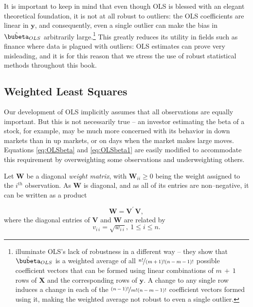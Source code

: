 \documentclass[graybox,envcountchap,sectrefs]{svmono}\usepackage[]{graphicx}\usepackage[]{xcolor}
\begin{document}
\begin{appendices}
It is important to keep in mind that even though OLS is blessed with
an elegant theoretical foundation, it is not at all robust to outliers:
the OLS coefficients are linear in $\mathrm{\mathbf{y}}$, and consequently,
even a single outlier can make the bias in $\hat{\bubeta}_{OLS}$
arbitrarily large.\footnote{\citet{HeitmanOrd85} illuminate OLS's lack of robustness in a different
way -- they show that $\hat{\bubeta}_{OLS}$ is a weighted average
of all $\nicefrac{n!}{\left(m\,+\,1\right)!\left(n\,-\,m\,-\,1\right)!}$
possible coefficient vectors that can be formed using linear combinations
of $m\,+\,1$ rows of $\mathbf{X}$ and the corresponding rows of
$\mathrm{\mathbf{y}}$. A change to any single row induces a change
in each of the $\nicefrac{\left(n\,-\,1\right)!}{m!\left(n\,-\,m\,-\,1\right)!}$
coefficient vectors formed using it, making the weighted average not
robust to even a single outlier.} This greatly reduces its utility in fields such as finance where
data is plagued with outliers: OLS estimates can prove very misleading,
and it is for this reason that we stress the use of robust statistical
methods throughout this book.

\subsection{Weighted Least Squares}

Our development of OLS implicitly assumes that all observations are
equally important. But this is not necessarily true -- an investor
estimating the beta of a stock, for example, may be much more concerned
with its behavior in down markets than in up markets, or on days when
the market makes large moves. Equations \eqref{eq:OLSbeta} and \eqref{eq:OLSbeta1}
are easily modified to accommodate this requirement by overweighting
some observations and underweighting others.

Let $\mathrm{\mathbf{W}}$ be a diagonal \emph{weight matrix}, with
$\mathrm{\mathbf{W}}_{ii}\geqslant0$ being the weight assigned to
the $i^{th}$ observation. As $\mathrm{\mathbf{W}}$ is diagonal,
and as all of its entries are non--negative, it can be written as
a product

\begin{equation}
\mathrm{\mathbf{W}}=\mathrm{\mathbf{V}}^{\prime}\,\mathrm{\mathbf{V}},\label{eq:WeightMatrixAsProduct}
\end{equation}
where the diagonal entries of $\mathrm{\mathrm{\mathbf{V}}}$ and
$\mathrm{\mathbf{\mathbf{W}}}$ are related by
\begin{equation}
v_{i\,i}=\sqrt{w_{i\,i}},\ 1\leqslant i\leqslant n.\label{eq:VsquareRootW}
\end{equation}


\end{appendices}
\end{document}
